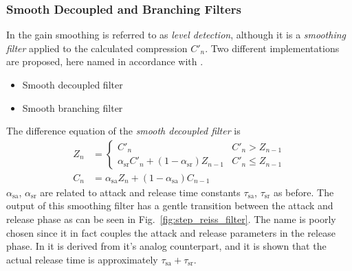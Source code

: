\documentclass[../main2.tex]{subfiles}
\begin{document}
\subsubsection{Smooth Decoupled and Branching Filters}
In \cite{reiss2012tutorial} the gain smoothing is referred to as \emph{level detection}, although it is a \emph{smoothing filter} applied to the calculated compression $C'_n$. Two different implementations are proposed, here named in accordance with \cite{reiss2012tutorial}.
\begin{itemize}
\item{Smooth decoupled filter}
\item{Smooth branching filter}
\end{itemize}
The difference equation of the \emph{smooth decoupled filter} is
\begin{equation}\label{eq:smooth_decoupled_det}
\begin{split}
Z_n &= \begin{cases}
   C'_n									& C'_n > Z_{n-1} \\
    \alpha_\text{sr} C'_n + (1-\alpha_\text{sr}) Z_{n-1} & C'_n \leq Z_{n-1}
\end{cases} \\
C_n &= \alpha_\text{sa} Z_n + (1-\alpha_\text{sa}) C_{n-1}
\end{split}
\end{equation}
$\alpha_\text{sa}$, $\alpha_\text{sr}$ are related to attack and release time constants $\tau_\text{sa}$, $\tau_\text{sr}$ as before. The output of this smoothing filter has a gentle transition between the attack and release phase as can be seen in Fig.~\ref{fig:step_reiss_filter}. The name is poorly chosen since it in fact couples the attack and release parameters in the release phase. In \cite{reiss2012tutorial} it is derived from it's analog counterpart, and it is shown that the actual release time is approximately $\tau_\text{sa} + \tau_\text{sr}$.
\end{document}

